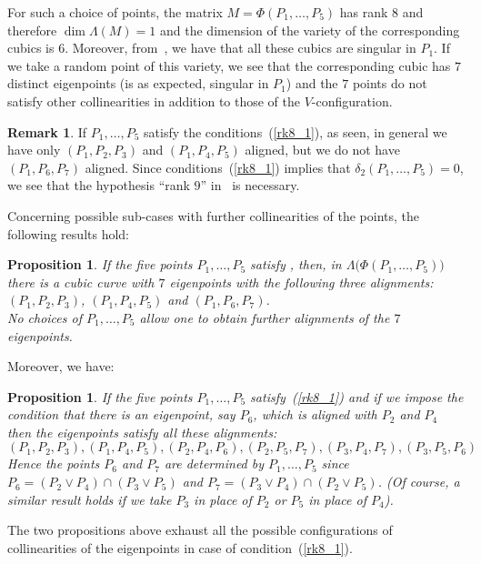 \documentclass{amsart}
\theoremstyle{plain}
\newtheorem{prop}[lemma]{Proposition}
\theoremstyle{definition}
\newtheorem{rmk}[lemma]{Remark}
\begin{document}
For such a choice
of points, the matrix $M = \Phi(P_1, \dots, P_5)$ has rank $8$
and therefore $\dim \Lambda(M) = 1$ and the dimension of the variety
of the corresponding cubics is $6$.
Moreover, from~, we have that all these cubics
are singular in $P_1$.
If we take a random point of this variety, we see that the corresponding
cubic has $7$ distinct eigenpoints (is as expected, singular in $P_1$) and the
$7$ points do not satisfy other collinearities in addition to those of the
$V$-configuration.

\begin{rmk}
\label{rmk:particular_cases}
If $P_1, \dots, P_5$ satisfy the conditions~(\ref{rk8_1}), as seen,
in general we have only $(P_1, P_2, P_3)$ and $(P_1, P_4, P_5)$ aligned, but
we do not have $(P_1, P_6, P_7)$ aligned. Since conditions~(\ref{rk8_1})
implies that $\delta_2(P_1, \dots, P_5) = 0$, we see
that the hypothesis ``rank $9$''
in~ is necessary.
\end{rmk}

Concerning possible sub-cases with further collinearities of the points,
the following results hold:
\begin{prop}
\label{three_d_three_alignments}
If the five points $P_1, \dots, P_5$ satisfy ,
then, in $\Lambda \bigl( \Phi(P_1, \dotsc, P_5)\bigr)$ there is
a cubic curve with $7$ eigenpoints with the following three alignments:
$(P_1, P_2, P_3)$, $(P_1, P_4, P_5)$ and $(P_1, P_6, P_7)$. \\
No choices of $P_1, \dots, P_5$ allow one to obtain further alignments of the
$7$ eigenpoints.
\end{prop}
Moreover, we have:
\begin{prop}
\label{prop:d2_6allin}
If the five points $P_1, \dots, P_5$ satisfy~(\ref{rk8_1})
and if we impose the condition that there is an eigenpoint, say $P_6$,
which is aligned with $P_2$ and $P_4$ then the eigenpoints satisfy all these
alignments:
\[
(P_1, P_2, P_3), (P_1, P_4, P_5), (P_2, P_4, P_6), (P_2, P_5, P_7),
(P_3, P_4, P_7), (P_3, P_5, P_6)
\]
Hence the points $P_6$ and $P_7$ are determined by $P_1, \dots, P_5$
since
$P_6 = (P_2 \vee P_4) \cap (P_3 \vee P_5)$
and $P_7 = (P_3 \vee P_4) \cap (P_2 \vee P_5)$.
(Of course, a similar result holds if we take $P_3$ in place of $P_2$ or $P_5$
in place of $P_4$).
\end{prop}
The two propositions above exhaust all the possible configurations
of collinearities of the eigenpoints in case of condition~(\ref{rk8_1}).
\end{document}
